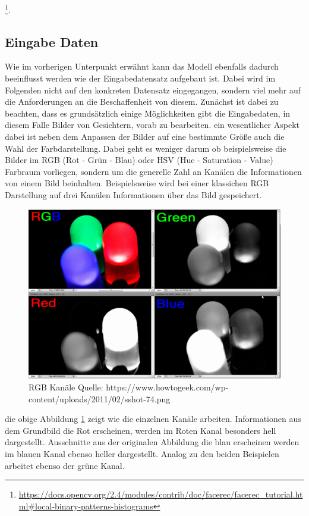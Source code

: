 \documentclass[12pt, a4paper]{scrbook}
\begin{document}
\footnote{\url{https://docs.opencv.org/2.4/modules/contrib/doc/facerec/facerec_tutorial.html\#local-binary-patterns-histograms}}. 
\subsection{Eingabe Daten}
\label{subsec: Eingabe Daten}
Wie im vorherigen Unterpunkt erwähnt kann das Modell ebenfalls dadurch beeinflusst werden wie der Eingabedatensatz aufgebaut ist. Dabei wird im Folgenden nicht auf den konkreten Datensatz eingegangen, sondern viel mehr auf die Anforderungen an die Beschaffenheit von diesem. Zunächst ist dabei zu beachten, dass es grundsätzlich einige Möglichkeiten gibt die Eingabedaten, in diesem Falle Bilder von Gesichtern, vorab zu bearbeiten. ein wesentlicher Aspekt dabei ist neben dem Anpassen der Bilder auf eine bestimmte Größe auch die Wahl der Farbdarstellung. Dabei geht es weniger darum ob beispielsweise die Bilder im RGB (Rot - Grün - Blau) oder HSV (Hue - Saturation - Value) Farbraum vorliegen, sondern um die generelle Zahl an Kanälen die Informationen von einem Bild beinhalten.
Beispielsweise wird bei einer klassichen RGB Darstellung auf drei Kanälen Informationen über das Bild gespeichert. 
\begin{figure}[h]
\includegraphics[width=\linewidth]{Bilder/RGB.png}
\caption{RGB Kanäle \newline Quelle: https://www.howtogeek.com/wp-content/uploads/2011/02/sshot-74.png}
\label{fig: RGB}
\end{figure}
die obige Abbildung \ref{fig: RGB} zeigt wie die einzelnen Kanäle arbeiten. Informationen aus dem Grundbild die Rot erscheinen, werden im Roten Kanal besonders hell dargestellt. 
Ausschnitte aus der originalen Abbildung die blau erscheinen werden im blauen Kanal ebenso heller dargestellt. Analog zu den beiden Beispielen arbeitet ebenso der grüne Kanal.
\end{document}

